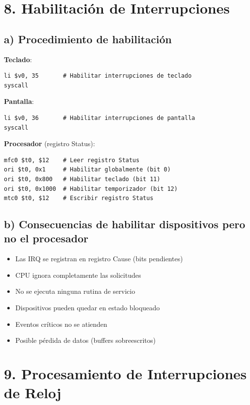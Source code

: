 \documentclass[12pt]{article}
\begin{document}
\section*{8. Habilitación de Interrupciones}
\subsection*{a) Procedimiento de habilitación}
\textbf{Teclado}:
\begin{lstlisting}
li $v0, 35       # Habilitar interrupciones de teclado
syscall
\end{lstlisting}

\textbf{Pantalla}:
\begin{lstlisting}
li $v0, 36       # Habilitar interrupciones de pantalla
syscall
\end{lstlisting}

\textbf{Procesador} (registro Status):
\begin{lstlisting}
mfc0 $t0, $12    # Leer registro Status
ori $t0, 0x1     # Habilitar globalmente (bit 0)
ori $t0, 0x800   # Habilitar teclado (bit 11)
ori $t0, 0x1000  # Habilitar temporizador (bit 12)
mtc0 $t0, $12    # Escribir registro Status
\end{lstlisting}

\subsection*{b) Consecuencias de habilitar dispositivos pero no el procesador}
\begin{itemize}
    \item Las IRQ se registran en registro Cause (bits pendientes)
    \item CPU ignora completamente las solicitudes
    \item No se ejecuta ninguna rutina de servicio
    \item Dispositivos pueden quedar en estado bloqueado
    \item Eventos críticos no se atienden
    \item Posible pérdida de datos (buffers sobreescritos)
\end{itemize}

\section*{9. Procesamiento de Interrupciones de Reloj}
\end{document}
